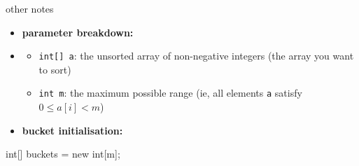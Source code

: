 \begin{mybox}[OrangeRed]{other notes}

    \noindent
    \begin{minipage}{0.4\textwidth}
        \begin{itemize}
            \item[] \textbf{parameter breakdown:}
        \end{itemize}
    \end{minipage}
    \begin{minipage}{0.6\textwidth}
        \begin{tightcode}
public static void bucketSort(int[] a, int m) {
        \end{tightcode}
    \end{minipage}

    \begin{itemize}
        \item []{}
            \begin{itemize}
                \item \texttt{int[] a}: the unsorted array of non-negative integers (the array you want to sort)
                \item \texttt{int m}: the maximum possible range (ie, all elements \texttt{a} satisfy $0 \leq a[i] < m$)
            \end{itemize}
    \end{itemize}

    \noindent
    \begin{minipage}{0.4\textwidth}
        \begin{itemize}
            \item[] \textbf{bucket initialisation:}
        \end{itemize}
    \end{minipage}
    \begin{minipage}{0.6\textwidth}
        \begin{tightcode}
int[] buckets = new int[m];
        \end{tightcode}
    \end{minipage} 
\end{mybox}

